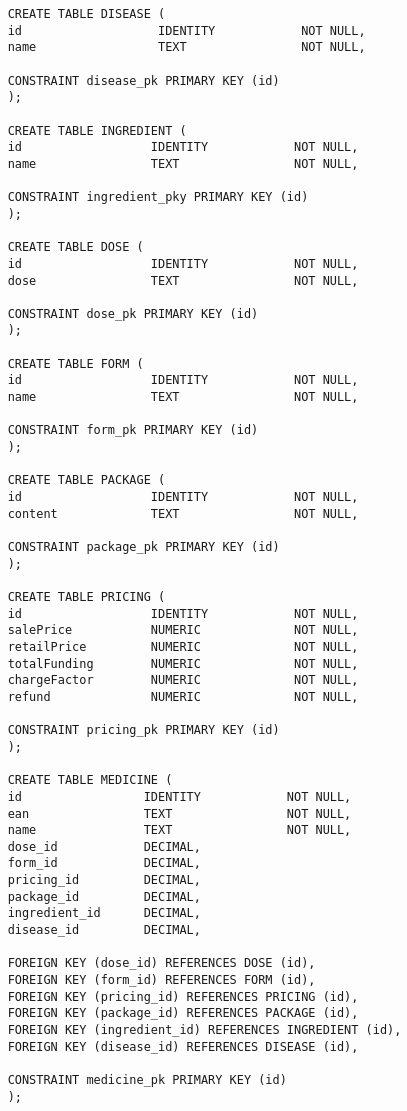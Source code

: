 \documentclass{article}
\begin{document}
  \begin{lstlisting}
    CREATE TABLE DISEASE (
    id                   IDENTITY            NOT NULL,
    name                 TEXT                NOT NULL,

    CONSTRAINT disease_pk PRIMARY KEY (id)
    );

    CREATE TABLE INGREDIENT (
    id                  IDENTITY            NOT NULL,
    name                TEXT                NOT NULL,

    CONSTRAINT ingredient_pky PRIMARY KEY (id)
    );

    CREATE TABLE DOSE (
    id                  IDENTITY            NOT NULL,
    dose                TEXT                NOT NULL,

    CONSTRAINT dose_pk PRIMARY KEY (id)
    );

    CREATE TABLE FORM (
    id                  IDENTITY            NOT NULL,
    name                TEXT                NOT NULL,

    CONSTRAINT form_pk PRIMARY KEY (id)
    );

    CREATE TABLE PACKAGE (
    id                  IDENTITY            NOT NULL,
    content             TEXT                NOT NULL,

    CONSTRAINT package_pk PRIMARY KEY (id)
    );

    CREATE TABLE PRICING (
    id                  IDENTITY            NOT NULL,
    salePrice           NUMERIC             NOT NULL,
    retailPrice         NUMERIC             NOT NULL,
    totalFunding        NUMERIC             NOT NULL,
    chargeFactor        NUMERIC             NOT NULL,
    refund              NUMERIC             NOT NULL,

    CONSTRAINT pricing_pk PRIMARY KEY (id)
    );

    CREATE TABLE MEDICINE (
    id                 IDENTITY            NOT NULL,
    ean                TEXT                NOT NULL,
    name               TEXT                NOT NULL,
    dose_id            DECIMAL,
    form_id            DECIMAL,
    pricing_id         DECIMAL,
    package_id         DECIMAL,
    ingredient_id      DECIMAL,
    disease_id         DECIMAL,

    FOREIGN KEY (dose_id) REFERENCES DOSE (id),
    FOREIGN KEY (form_id) REFERENCES FORM (id),
    FOREIGN KEY (pricing_id) REFERENCES PRICING (id),
    FOREIGN KEY (package_id) REFERENCES PACKAGE (id),
    FOREIGN KEY (ingredient_id) REFERENCES INGREDIENT (id),
    FOREIGN KEY (disease_id) REFERENCES DISEASE (id),

    CONSTRAINT medicine_pk PRIMARY KEY (id)
    );
  \end{lstlisting}
\end{document}
